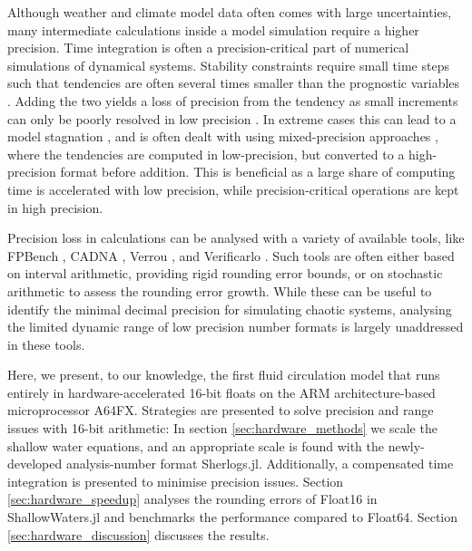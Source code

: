 Although weather and climate model data often comes with large uncertainties, many intermediate calculations inside a model simulation
require a higher precision. Time integration is often a precision-critical part of numerical simulations of dynamical systems. Stability constraints
require small time steps such that tendencies are often several times smaller than the prognostic variables \citep{Courant1967}.
Adding the two yields a loss of precision from the tendency as small increments can only be poorly resolved in low precision
\citep{Gill1951,Kahan1965,Moller1965}. In extreme cases this can lead to a model stagnation \citep{Croci2020}, and is often
dealt with using mixed-precision approaches \citep{Dawson2018,Klower2020a,TintoPrims2019}, where the tendencies are computed
in low-precision, but converted to a high-precision format before addition. This is beneficial as a large share of computing time is
accelerated with low precision, while precision-critical operations are kept in high precision.

Precision loss in calculations can be analysed with a variety of available tools, like FPBench \citep{Damouche2017},
CADNA \citep{Jezequel2008}, Verrou \citep{Fevotte2019}, and Verificarlo \citep{Denis2016}. Such tools are often either
based on interval arithmetic, providing rigid rounding error bounds, or on stochastic arithmetic to assess the rounding error growth.
While these can be useful to identify the minimal decimal precision for simulating chaotic systems, analysing the limited dynamic range
of low precision number formats is largely unaddressed in these tools.

Here, we present, to our knowledge, the first fluid circulation model that runs entirely in hardware-accelerated 16-bit floats on the
ARM architecture-based microprocessor A64FX. Strategies are presented to solve precision and range issues with 16-bit arithmetic:
In section \ref{sec:hardware_methods} we scale the shallow water equations, and an appropriate scale is found with the
newly-developed analysis-number format Sherlogs.jl. Additionally, a compensated time integration is presented to minimise
precision issues. Section \ref{sec:hardware_speedup} analyses the rounding errors of Float16 in ShallowWaters.jl and
benchmarks the performance compared to Float64. Section \ref{sec:hardware_discussion} discusses the results.

